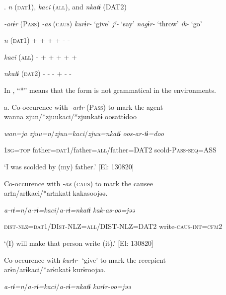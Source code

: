 \begin{styleBeschriftung}
\textmd{}\textmd{.} \textmd{\textit{n}}\textmd{ (\textsc{dat}1),} \textmd{\textit{kaci}}\textmd{ (\textsc{all}), and} \textmd{\textit{nkatɨ}}\textmd{ (DAT2)}
\end{styleBeschriftung}

    \textit{{}-arɨr} (P\textsc{ass})  \textit{{}-as} (\textsc{caus})  \textit{kurɨr-} ‘give’  \textit{jˀ-} ‘say’  \textit{nagɨr-} ‘throw’  \textit{ik-} ‘go’

\textit{n}  (\textsc{dat}1)  +  +  +  +  {}-  {}-

\textit{kaci}  (\textsc{all})  {}-  +  +  +  +  +

\textit{nkatɨ}  (\textsc{dat}2)  {}-  {}-  {}-  +  {}-  {}-

In , “*” means that the form is not grammatical in the environments.

\ea\label{ex:6-82}
 a. Co-occurence with \textit{{}-arɨr} (P\textsc{ass}) to mark the agent\\

{\TM}
\gll wanna  zjun/*zjuukaci/*zjunkatɨ  oosattɨdoo

    \textit{wan=ja}  \textit{zjuu=n}/\textit{zjuu=kaci}/\textit{zjuu=nkatɨ}  \textit{oos-ar-tɨ=doo}

    1\textsc{sg}=\textsc{top}  father=\textsc{dat}1/father=\textsc{all}/father=DAT2  scold-P\textsc{ass}-\textsc{seq}=ASS

\glt    ‘I was scolded by (my) father.’ [El: 130820]

\ex Co-occurence with \textit{{}-as} (\textsc{caus}) to mark the causee\\

{\TM}
\gll arɨn/arɨkaci/*arɨnkatɨ  kakasoojəə.

    \textit{a-rɨ=n}/\textit{a-rɨ=kaci}/\textit{a-rɨ=nkatɨ}  \textit{kak-as-oo=jəə}

    \textsc{dist}-\textsc{nlz}=\textsc{dat}1/DI\textsc{st}-NLZ=\textsc{all}/DIST-NLZ=DAT2  write-\textsc{caus}-\textsc{int}=\textsc{cfm}2

\glt    ‘(I) will make that person write (it).’ [El: 130820]

\ex Co-occurence with \textit{kurɨr-} ‘give’ to mark the recepient\\

{\TM}
\gll arɨn/arɨkaci/*arɨnkatɨ  kurɨroojəə.

    \textit{a-rɨ=n}/\textit{a-rɨ=kaci}/\textit{a-rɨ=nkatɨ}  \textit{kurɨr-oo=jəə}

